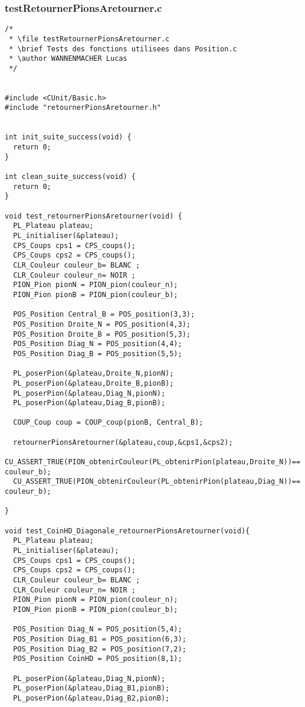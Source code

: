 \subsubsection{testRetournerPionsAretourner.c}
\begin{lstlisting}
/*
 * \file testRetournerPionsAretourner.c
 * \brief Tests des fonctions utilisees dans Position.c
 * \author WANNENMACHER Lucas
 */


#include <CUnit/Basic.h>
#include "retournerPionsAretourner.h"


int init_suite_success(void) {
  return 0;
}

int clean_suite_success(void) {
  return 0;
}

void test_retournerPionsAretourner(void) {
  PL_Plateau plateau;
  PL_initialiser(&plateau);
  CPS_Coups cps1 = CPS_coups();
  CPS_Coups cps2 = CPS_coups();
  CLR_Couleur couleur_b= BLANC ;
  CLR_Couleur couleur_n= NOIR ;
  PION_Pion pionN = PION_pion(couleur_n);
  PION_Pion pionB = PION_pion(couleur_b);

  POS_Position Central_B = POS_position(3,3);
  POS_Position Droite_N = POS_position(4,3);
  POS_Position Droite_B = POS_position(5,3);
  POS_Position Diag_N = POS_position(4,4);
  POS_Position Diag_B = POS_position(5,5);

  PL_poserPion(&plateau,Droite_N,pionN);
  PL_poserPion(&plateau,Droite_B,pionB);
  PL_poserPion(&plateau,Diag_N,pionN);
  PL_poserPion(&plateau,Diag_B,pionB);

  COUP_Coup coup = COUP_coup(pionB, Central_B);

  retournerPionsAretourner(&plateau,coup,&cps1,&cps2);
  CU_ASSERT_TRUE(PION_obtenirCouleur(PL_obtenirPion(plateau,Droite_N))== couleur_b);
  CU_ASSERT_TRUE(PION_obtenirCouleur(PL_obtenirPion(plateau,Diag_N))== couleur_b);

}

void test_CoinHD_Diagonale_retournerPionsAretourner(void){
  PL_Plateau plateau;
  PL_initialiser(&plateau);
  CPS_Coups cps1 = CPS_coups();
  CPS_Coups cps2 = CPS_coups();
  CLR_Couleur couleur_b= BLANC ;
  CLR_Couleur couleur_n= NOIR ;
  PION_Pion pionN = PION_pion(couleur_n);
  PION_Pion pionB = PION_pion(couleur_b);

  POS_Position Diag_N = POS_position(5,4);
  POS_Position Diag_B1 = POS_position(6,3);
  POS_Position Diag_B2 = POS_position(7,2);
  POS_Position CoinHD = POS_position(8,1);

  PL_poserPion(&plateau,Diag_N,pionN);
  PL_poserPion(&plateau,Diag_B1,pionB);
  PL_poserPion(&plateau,Diag_B2,pionB);


\end{lstlisting}
